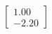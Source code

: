 \documentclass[preview]{standalone}
\begin{document}
\begin{align*}
\begin{bmatrix} 1.00 \\ -2.20 \end{bmatrix}
\end{align*}
\end{document}
